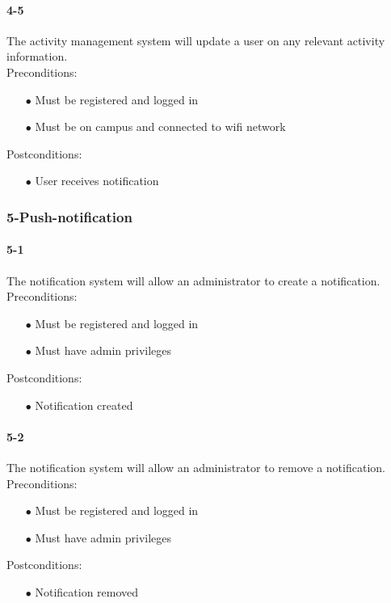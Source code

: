 \documentclass[a4paper,12pt]{article}
\begin{document}
\paragraph{4-5}
The activity management system will update a user on any relevant activity information.\\
Preconditions:
\begin{itemize}
	\item[$\bullet$] Must be registered and logged in
	\item[$\bullet$] Must be on campus and connected to wifi network
\end{itemize}
Postconditions:
\begin{itemize}
	\item[$\bullet$] User receives notification
\end{itemize}
\subsubsection{5-Push-notification}
\paragraph{5-1}
The notification system will allow an administrator to create a notification.\\
Preconditions:
\begin{itemize}
	\item[$\bullet$] Must be registered and logged in
	\item[$\bullet$] Must have admin privileges
\end{itemize}
Postconditions:
\begin{itemize}
	\item[$\bullet$] Notification created
\end{itemize}
\paragraph{5-2}
The notification system will allow an administrator to remove a notification.\\
Preconditions:
\begin{itemize}
	\item[$\bullet$] Must be registered and logged in
	\item[$\bullet$] Must have admin privileges
\end{itemize}
Postconditions:
\begin{itemize}
	\item[$\bullet$] Notification removed
\end{itemize}
\end{document}
